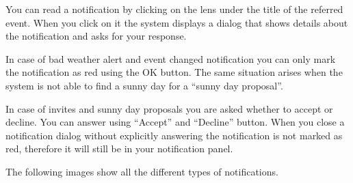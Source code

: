 \documentclass[10pt,a4paper,titlepage]{article}
\begin{document}
You can read a notification by clicking on the lens under the title of the referred event. When you click on it the system displays a dialog that shows details about the notification and asks for your response.

In case of bad weather alert and event changed notification you can only mark the notification as red using the OK button. The same situation arises when the system is not able to find a sunny day for a “sunny day proposal”. 

In case of invites and sunny day proposals you are asked whether to accept or decline. You can answer using “Accept” and “Decline” button. When you close a notification dialog without explicitly answering the notification is not marked as red, therefore it will still be in your notification panel.

The following images show all the different types of notifications.
\end{document}
